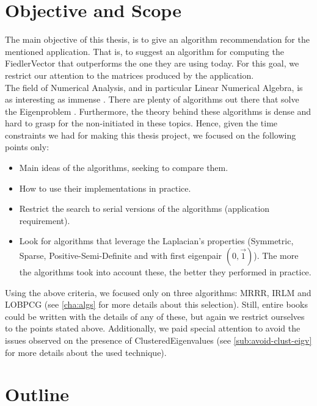 \section{Objective and Scope}

The main objective of this thesis, is to give an algorithm
recommendation for the mentioned application. That is, to suggest
an algorithm for computing the \gls{FiedlerVector} that outperforms
the one they are using today. For this goal, we restrict our attention
to the matrices produced by the application. \\

The field of Numerical Analysis, and in particular Linear Numerical
Algebra, is as interesting as immense \cite{golub13}. There are plenty
of algorithms out there that solve the Eigenproblem
\cite{golub00}. Furthermore, the theory behind 
these algorithms is dense and hard to 
grasp for the non-initiated in these topics. Hence, given
the time constraints we had for making this thesis project, we focused
on the following points only:

\begin{itemize}
\item Main ideas of the algorithms, seeking to compare them.
\item How to use their implementations in practice.
\item Restrict the search to serial versions of the algorithms
  (application requirement).
\item Look for algorithms that leverage the \gls{Laplacian}'s properties
  (Symmetric, Sparse, Positive-Semi-Definite and with first eigenpair
  $(0,\vec{1})$). The more the algorithms took into account these, the
  better they performed in practice. 
\end{itemize}

Using the above criteria, we focused only on three algorithms: \gls{MRRR},
\gls{IRLM} and \gls{LOBPCG} (see \cref{cha:algs} for more details
about this selection). Still, entire books could be written with the 
details of any of these, but again we restrict ourselves to the points
stated above. Additionally, we paid 
special attention to avoid the issues observed on the
presence of \gls{ClusteredEigenvalues} (see
\cref{sub:avoid-clust-eigv} for more details about the used
technique). 

\section{Outline}


